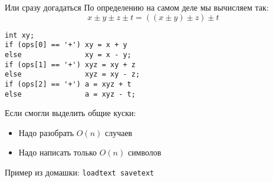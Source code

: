 \begin{frame}[t,fragile]{Или сразу догадаться}
	По определению на самом деле мы вычисляем так:
	\[
		x \pm y \pm z \pm t = ((x \pm y) \pm z) \pm t
	\]
\begin{verbatim}
int xy;
if (ops[0] == '+') xy = x + y
else               xy = x - y;
if (ops[1] == '+') xyz = xy + z
else               xyz = xy - z;
if (ops[2] == '+') a = xyz + t
else               a = xyz - t;
\end{verbatim}
	Если смогли выделить общие куски:
	\begin{itemize}
	\item Надо разобрать $O(n)$ случаев
	\item Надо написать только $O(n)$ символов
	\end{itemize}
	Пример из домашки: \texttt{loadtext savetext}
\end{frame}

